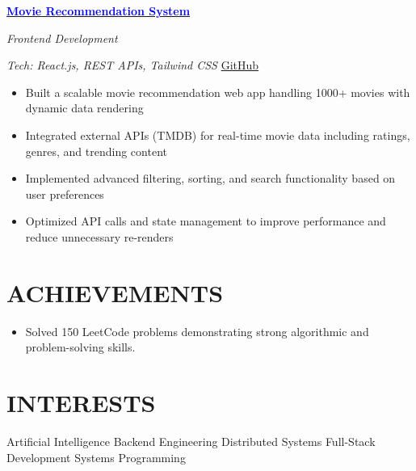 \documentclass[11pt,a4paper]{article}
\newcommand{\projectentry}[2]{
    \vspace{8pt}
    \noindent
    \begin{minipage}[t]{0.7\textwidth}
        \textbf{#1}
    \end{minipage}%
    \hfill%
    \begin{minipage}[t]{0.25\textwidth}
        \raggedleft
        \textit{#2}
    \end{minipage}
}
\begin{document}
\projectentry{\href{https://movie-recommender-six-kappa.vercel.app/}
{\textcolor{blue}{Movie Recommendation System}}}{Frontend Development}
\textit{Tech: React.js, REST APIs, Tailwind CSS} \hfill
\href{https://github.com/Vashu-Kumar}{GitHub} 
\begin{itemize}
    \item Built a scalable movie recommendation web app handling 1000+ movies with dynamic data rendering
    \item Integrated external APIs (TMDB) for real-time movie data including ratings, genres, and trending content
    \item Implemented advanced filtering, sorting, and search functionality based on user preferences
    \item Optimized API calls and state management to improve performance and reduce unnecessary re-renders
\end{itemize}



\section{ACHIEVEMENTS}

\begin{itemize}
    \item Solved 150 LeetCode problems demonstrating strong algorithmic and problem-solving skills.
\end{itemize}

\section{INTERESTS}
Artificial Intelligence \textbullet{} Backend Engineering \textbullet{} Distributed Systems \textbullet{} Full-Stack Development \textbullet{} Systems Programming
\end{document}
